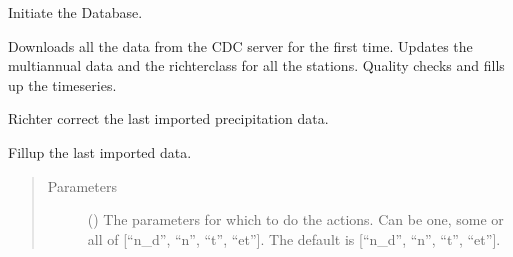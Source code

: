 \documentclass[letterpaper,10pt,english]{sphinxmanual}
\begin{document}
\begin{fulllineitems}
\begin{fulllineitems}
\end{fulllineitems}


\begin{fulllineitems}
\label{\detokenize{weatherDB:weatherDB.broker.Broker.initiate_db}}
\sphinxAtStartPar
Initiate the Database.

\sphinxAtStartPar
Downloads all the data from the CDC server for the first time.
Updates the multi\sphinxhyphen{}annual data and the richter\sphinxhyphen{}class for all the stations.
Quality checks and fills up the timeseries.

\end{fulllineitems}


\begin{fulllineitems}
\label{\detokenize{weatherDB:weatherDB.broker.Broker.last_imp_corr}}
\sphinxAtStartPar
Richter correct the last imported precipitation data.

\end{fulllineitems}


\begin{fulllineitems}
\label{\detokenize{weatherDB:weatherDB.broker.Broker.last_imp_fillup}}
\sphinxAtStartPar
Fillup the last imported data.
\begin{quote}\begin{description}
\item[{Parameters}] \leavevmode
\sphinxAtStartPar
{} (\sphinxstyleliteralemphasis{\sphinxupquote{, }}) \textendash{} The parameters for which to do the actions.
Can be one, some or all of {[}“n\_d”, “n”, “t”, “et”{]}.
The default is {[}“n\_d”, “n”, “t”, “et”{]}.


\end{description}
\end{quote}
\end{fulllineitems}
\end{fulllineitems}
\end{document}
